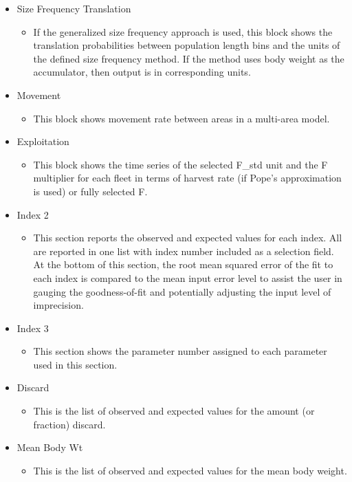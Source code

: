 \begin{itemize}
	\item Size Frequency Translation
	\begin{itemize}
		\item If the generalized size frequency approach is used, this block shows the translation probabilities between population length bins and the units of the defined size frequency method.  If the method uses body weight as the accumulator, then output is in corresponding units.
	\end{itemize}
	\item Movement
	\begin{itemize}
		\item This block shows movement rate between areas in a multi-area model.
	\end{itemize}
	\item Exploitation
	\begin{itemize}
		\item This block shows the time series of the selected F\_std unit and the F multiplier for each fleet in terms of harvest rate (if Pope's approximation is used) or fully selected F.
	\end{itemize}
	\item Index 2
	\begin{itemize}
		\item This section reports the observed and expected values for each index. All are reported in one list with index number included as a selection field. At the bottom of this section, the root mean squared error of the fit to each index is compared to the mean input error level to assist the user in gauging the goodness-of-fit and potentially adjusting the input level of imprecision.
	\end{itemize}
	\item Index 3
	\begin{itemize}
		\item This section shows the parameter number assigned to each parameter used in this section.
	\end{itemize}
	\item Discard
	\begin{itemize}
		\item This is the list of observed and expected values for the amount (or fraction) discard.
	\end{itemize}
	\item Mean Body Wt
	\begin{itemize}
		\item This is the list of observed and expected values for the mean body weight.

\end{itemize}
\end{itemize}
